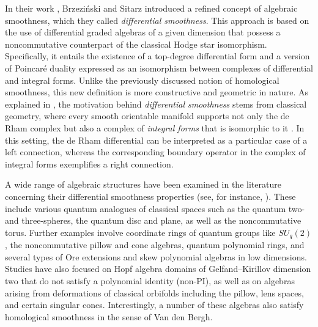 \documentclass{amsart}
\theoremstyle{definition}
\theoremstyle{remark}
\numberwithin{equation}{section}
\begin{document}
In their work \cite{BrzezinskiSitarz2017}, Brzezi{\'n}ski and Sitarz introduced a refined concept of algebraic smoothness, which they called {\em differential smoothness}. This approach is based on the use of differential graded algebras of a given dimension that possess a noncommutative counterpart of the classical Hodge star isomorphism. Specifically, it entails the existence of a top-degree differential form and a version of Poincar\'e duality expressed as an isomorphism between complexes of differential and integral forms. Unlike the previously discussed notion of homological smoothness, this new definition is more constructive and geometric in nature. As explained in \cite[p.~413]{BrzezinskiSitarz2017}, the motivation behind {\em differential smoothness} stems from classical geometry, where every smooth orientable manifold supports not only the de Rham complex but also a complex of {\em integral forms} that is isomorphic to it \cite[Section~4.5]{Manin1997}. In this setting, the de Rham differential can be interpreted as a particular case of a left connection, whereas the corresponding boundary operator in the complex of integral forms exemplifies a right connection.

A wide range of algebraic structures have been examined in the literature concerning their differential smoothness properties (see, for instance, \cite{Brzezinski2015, Brzezinski2016, BrzezinskiElKaoutitLomp2010, BrzezinskiLomp2018, BrzezinskiSitarz2017, DuboisViolette1988, DuboisVioletteKernerMadore1990, Karacuha2015, KaracuhaLomp2014, ReyesSarmiento2022}). These include various quantum analogues of classical spaces such as the quantum two- and three-spheres, the quantum disc and plane, as well as the noncommutative torus. Further examples involve coordinate rings of quantum groups like $SU_q(2)$, the noncommutative pillow and cone algebras, quantum polynomial rings, and several types of Ore extensions and skew polynomial algebras in low dimensions. Studies have also focused on Hopf algebra domains of Gelfand–Kirillov dimension two that do not satisfy a polynomial identity (non-PI), as well as on algebras arising from deformations of classical orbifolds including the pillow, lens spaces, and certain singular cones. Interestingly, a number of these algebras also satisfy homological smoothness in the sense of Van den Bergh.


\end{document}
